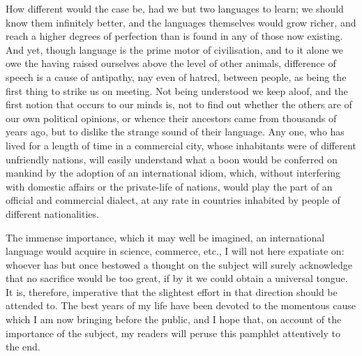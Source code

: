 How different would the case be, had we but two languages to learn; we should know them infinitely better, and the languages themselves would grow richer, and reach a higher degrees of perfection than is found in any of those now existing. And yet, though language is the prime motor of civilisation, and to it alone we owe the having raised ourselves above the level of other animals, difference of speech is a cause of antipathy, nay even of hatred, between people, as being the first thing to strike us on meeting. Not being understood we keep aloof, and the first notion that occurs to our minds is, not to find out whether the others are of our own political opinions, or whence their ancestors came from thousands of years ago, but to dislike the strange sound of their language. Any one, who has lived for a length of time in a commercial city, whose inhabitants were of different unfriendly nations, will easily understand what a boon would be conferred on mankind by the adoption of an international idiom, which, without interfering with domestic affairs or the private-life of nations, would play the part of an official and commercial dialect, at any rate in countries inhabited by people of different nationalities.

The immense importance, which it may well be imagined, an international language would acquire in science, commerce, etc., I will not here expatiate on: whoever has but once bestowed a thought on the subject will surely acknowledge that no sacrifice would be too great, if by it we could obtain a universal tongue. It is, therefore, imperative that the slightest effort in that direction should be attended to. The best years of my life have been devoted to the momentous cause which I am now bringing before the public, and I hope that, on account of the importance of the subject, my readers will peruse this pamphlet attentively to the end.

